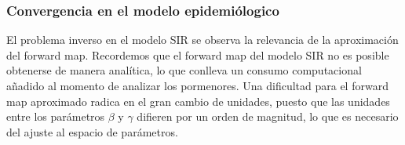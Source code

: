 
\newpage

\newpage

\newpage

\newpage


\subsubsection{Convergencia en el modelo epidemiólogico}

El problema inverso en el modelo SIR se observa la relevancia de la aproximación del forward map. Recordemos que el forward map del modelo SIR no es posible obtenerse de manera analítica, lo que conlleva un consumo computacional añadido al momento de analizar los pormenores. Una dificultad para el forward map aproximado radica en el gran cambio de unidades, puesto que las unidades entre los parámetros $\beta$ y $\gamma$ difieren por un orden de magnitud, lo que es necesario del ajuste al espacio de parámetros. 







